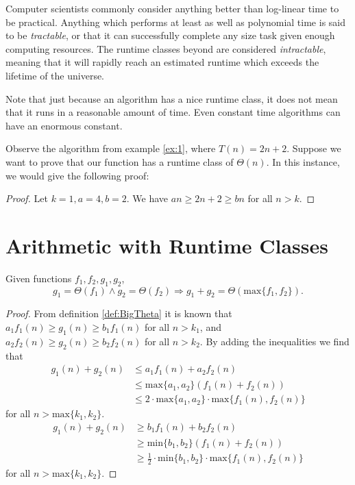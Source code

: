 \documentclass{article}
\begin{document}
 \begin{remark}
  Computer scientists commonly consider anything better than log-linear time to be practical. Anything which performs at least as well as polynomial time is said to be \emph{tractable}, or that it can successfully complete any size task given enough computing resources. The runtime classes beyond are considered \emph{intractable}, meaning that it will rapidly reach an estimated runtime which exceeds the lifetime of the universe. \cite{roughgarden22}
 \end{remark}
 \begin{remark}
  Note that just because an algorithm has a nice runtime class, it does not mean that it runs in a reasonable amount of time. Even constant time algorithms can have an enormous constant.
 \end{remark}

 \begin{example}\label{ex:2}
  Observe the algorithm from example \ref{ex:1}, where $T(n)=2n+2$. Suppose we want to prove that our function has a runtime class of $\Theta(n)$. In this instance, we would give the following proof:
  \begin{proof}
   Let $k=1,a=4,b=2$. We have $an \geq 2n+2 \geq bn$ for all $n>k$.
  \end{proof}
 \end{example}



 \section{Arithmetic with Runtime Classes}

 \begin{theorem}\label{thm:sums}
  Given functions $f_1,f_2,g_1,g_2$,
  $$ g_1=\Theta(f_1) \land g_2=\Theta(f_2) \Longrightarrow g_1+g_2 = \Theta(\text{max}\{f_1,f_2\}). $$
 \end{theorem}
 \begin{proof}
  From definition \ref{def:BigTheta} it is known that $a_1f_1(n) \geq g_1(n) \geq b_1f_1(n)$ for all $n>k_1$, and $a_2f_2(n) \geq g_2(n) \geq b_2f_2(n)$ for all $n>k_2$. By adding the inequalities we find that
  \begin{align*} %
   g_1(n)+g_2(n) &\leq a_1f_1(n) + a_2f_2(n) \\
   &\leq \text{max}\{a_1,a_2\}(f_1(n) + f_2(n)) \\
   &\leq 2 \cdot \text{max}\{a_1,a_2\} \cdot \text{max}\{f_1(n), f_2(n)\}
  \end{align*}
  for all $n>\text{max}\{k_1,k_2\}$.
  \begin{align*} %
   g_1(n)+g_2(n) &\geq b_1f_1(n) + b_2f_2(n) \\
   &\geq \text{min}\{b_1,b_2\}(f_1(n) + f_2(n)) \\
   &\geq \frac{1}{2} \cdot \text{min}\{b_1,b_2\} \cdot \text{max}\{f_1(n),f_2(n)\}
  \end{align*}
  for all $n>\text{max}\{k_1,k_2\}$.
 \end{proof}
\end{document}
